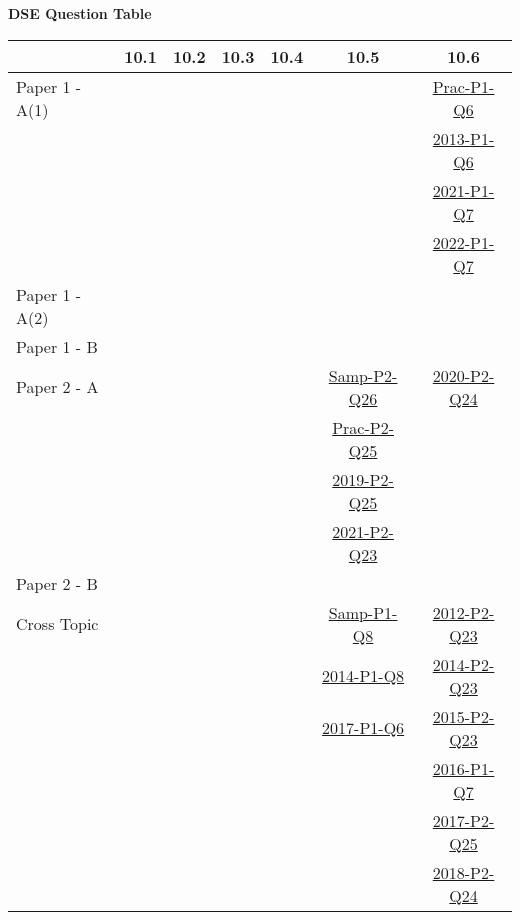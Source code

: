 \documentclass[12pt, a4paper]{article}
\begin{document}
\begin{absolutelynopagebreak}
\begin{center}
\textbf{DSE Question Table}
\end{center}
\begin{center}
\begin{tabular}{|l|c|c|c|c|c|c|}
\hline
        & 10.1 & 10.2 & 10.3 & 10.4 & 10.5 & 10.6 \\\hline
\hline
Paper 1 - A(1)&  &  &  &  &  & \hyperref[DSE2012P-CoreP1-Q06]{Prac-P1-Q6} \\
&  &  &  &  &  & \hyperref[DSE2013-CoreP1-Q06]{2013-P1-Q6} \\
&  &  &  &  &  & \hyperref[DSE2021-CoreP1-Q07]{2021-P1-Q7} \\
&  &  &  &  &  & \hyperref[DSE2022-CoreP1-Q07]{2022-P1-Q7} \\
\hline
Paper 1 - A(2)&  &  &  &  &  &  \\
\hline
Paper 1 - B&  &  &  &  &  &  \\
\hline
\hline
Paper 2 - A&  &  &  &  & \hyperref[DSE2012S-CoreP2-Q26]{Samp-P2-Q26} & \hyperref[DSE2020-CoreP2-Q24]{2020-P2-Q24} \\
&  &  &  &  & \hyperref[DSE2012P-CoreP2-Q25]{Prac-P2-Q25} &  \\
&  &  &  &  & \hyperref[DSE2019-CoreP2-Q25]{2019-P2-Q25} &  \\
&  &  &  &  & \hyperref[DSE2021-CoreP2-Q23]{2021-P2-Q23} &  \\
\hline
Paper 2 - B&  &  &  &  &  &  \\
\hline
\hline
Cross Topic&  &  &  &  & \hyperref[DSE2012S-CoreP1-Q08]{Samp-P1-Q8} & \hyperref[DSE2012-CoreP2-Q23]{2012-P2-Q23} \\
&  &  &  &  & \hyperref[DSE2014-CoreP1-Q08]{2014-P1-Q8} & \hyperref[DSE2014-CoreP2-Q23]{2014-P2-Q23} \\
&  &  &  &  & \hyperref[DSE2017-CoreP1-Q06]{2017-P1-Q6} & \hyperref[DSE2015-CoreP2-Q23]{2015-P2-Q23} \\
&  &  &  &  &  & \hyperref[DSE2016-CoreP1-Q07]{2016-P1-Q7} \\
&  &  &  &  &  & \hyperref[DSE2017-CoreP2-Q25]{2017-P2-Q25} \\
&  &  &  &  &  & \hyperref[DSE2018-CoreP2-Q24]{2018-P2-Q24} \\
\hline
\end{tabular}
\end{center}
\end{absolutelynopagebreak}
\end{document}
